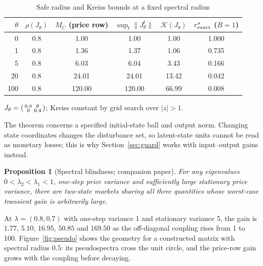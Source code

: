 \documentclass[12pt]{article}
\newtheorem{proposition}[theorem]{Proposition}
\theoremstyle{definition}
\theoremstyle{remark}
\begin{document}
\begin{table}[t]\centering\small
\begin{threeparttable}
\caption{Safe radius and Kreiss bounds at a fixed spectral radius}\label{tab:kreiss}
\begin{tabular}{rccccc}
\toprule
$\theta$ & $\rho(J_\theta)$ & $M_C$ (price row) & $\sup_t\|J_\theta^t\|$ & $\mathcal K(J_\theta)$ & $r^*_{\rm exact}$ ($B=1$)\\
\midrule
0 & 0.8 & 1.00 & 1.00 & 1.00 & 1.000\\
1 & 0.8 & 1.36 & 1.37 & 1.06 & 0.735\\
5 & 0.8 & 6.03 & 6.04 & 3.43 & 0.166\\
20 & 0.8 & 24.01 & 24.01 & 13.42 & 0.042\\
100 & 0.8 & 120.00 & 120.00 & 66.99 & 0.008\\
\bottomrule
\end{tabular}
\begin{tablenotes}\footnotesize\item $J_\theta=\begin{psmallmatrix}0.8&\theta\\0&0.4\end{psmallmatrix}$; Kreiss constant by grid search over $|z|>1$. \end{tablenotes}
\end{threeparttable}
\end{table}

The theorem concerns a specified initial-state ball and output norm. Changing state coordinates changes the disturbance set, so latent-state units cannot be read as monetary losses; this is why Section~\ref{sec:guard} works with input--output gains instead.

\begin{proposition}[Spectral blindness; companion paper]\label{prop:blind}
For any eigenvalues $0<\lambda_2<\lambda_1<1$, one-step price variance and sufficiently large stationary price variance, there are two-state markets sharing all three quantities whose worst-case transient gain is arbitrarily large.
\end{proposition}

At $\lambda=(0.8,0.7)$ with one-step variance 1 and stationary variance 5, the gain is $1.77$, $5.10$, $16.95$, $50.85$ and $169.50$ as the off-diagonal coupling rises from 1 to 100. Figure~\ref{fig:pseudo} shows the geometry for a constructed matrix with spectral radius $0.5$: its pseudospectra cross the unit circle, and the price-row gain grows with the coupling before decaying.
\end{document}
